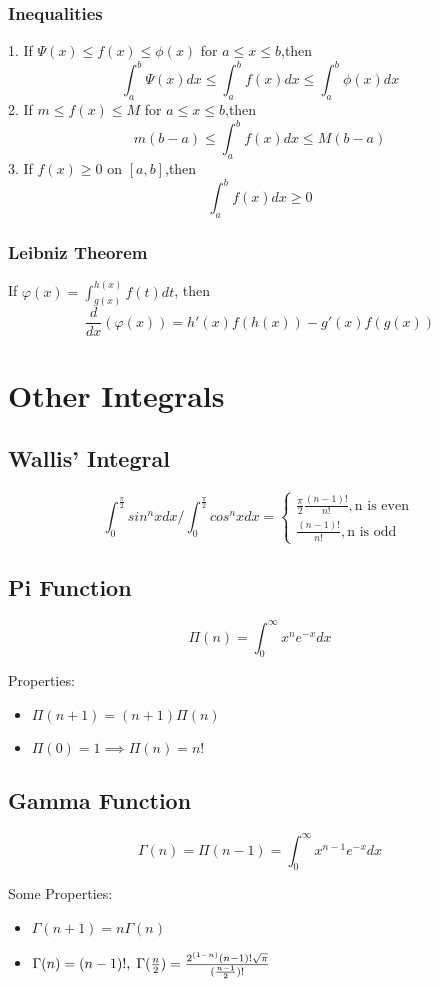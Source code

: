 \documentclass[twocolumn, 10pt]{article}
\begin{document}
\subsubsection{Inequalities}
1. If $\Psi(x) \le f(x) \le \phi(x)$  for $a \le x \le b$,then
$$\int_{a}^{b}\Psi(x)dx \le \int_{a}^{b}f(x)dx \le \int_{a}^{b}\phi(x)dx$$
2. If $m \le f(x) \le M$ for $a \le x \le b$,then 
$$m(b-a) \le \int_{a}^{b}f(x)dx \le M(b-a)$$
3. If $f(x) \ge 0$ on $[a,b]$,then $$\int_{a}^{b}f(x)dx \ge 0$$
\subsubsection{Leibniz Theorem} 
If $\varphi(x)=\int_{g(x)}^{h(x)}f(t)dt$, then
$$\frac{d}{dx}(\varphi(x))=h'(x)f(h(x))-g'(x)f(g(x))$$
\section{Other Integrals}
\subsection{Wallis' Integral}
$$\int_{0}^{\frac{\pi}{2}} sin^{n}xdx/\int_{0}^{\frac{\pi}{2}} cos^{n}xdx=
\begin{cases}
  \frac{\pi}{2}\frac{(n-1)!}{n!}, \text{n is even}\ \\
  
  \frac{(n-1)!}{n!},\text{n is odd}\
\end{cases} $$
\subsection{Pi Function}
$$\Pi(n)= \int_{0}^{\infty}x^{n}e^{-x}dx$$

Properties:
\begin{itemize}
\item $\Pi(n+1)=(n+1) \Pi(n)$
\item $\Pi(0)=1 \implies \Pi(n)=n!$
\end{itemize}
\subsection{Gamma Function}
$$\Gamma(n)=\Pi(n-1)= \int_{0}^{\infty}x^{n-1}e^{-x}dx$$

Some Properties:
\begin{itemize}
\item $\Gamma(n+1)=n \Gamma(n)$
\item $\Gamma(n)=(n-1)!, \thickspace \Gamma(\frac{n}{2})=\frac{2^{(1-n)} (n-1)!\sqrt{\pi}}{(\frac{n-1}{2})!}$
\end{itemize}
\end{document}
